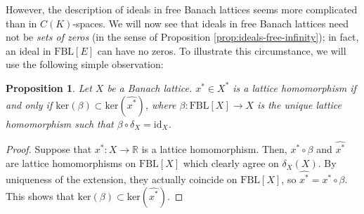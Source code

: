 \documentclass[11pt]{amsart}
\newtheorem{prop}[thm]{Proposition}
\theoremstyle{definition}
\numberwithin{equation}{section}
\newcommand{\fbl}{\text{FBL}}
\begin{document}
However, the description of ideals in free Banach lattices seems more complicated than in $C(K)$-spaces. We will now see that ideals in free Banach lattices need not be \textit{sets of zeros} (in the sense of Proposition \ref{prop:ideals-free-infinity}); in fact, an ideal in $\fbl[E]$ can have no zeros. To illustrate this circumstance, we will use the following simple observation:

\begin{prop}\label{prop:kernel-zero}
    Let $X$ be a Banach lattice. $x^*\in X^*$ is a lattice homomorphism if and only if $\text{ker}(\beta)\subset \text{ker}(\widehat{x^*})$, where $\beta:\fbl[X]\to X$ is the unique lattice homomorphism such that $\beta\circ\delta_X=\text{id}_X$.
\end{prop}
\begin{proof}
Suppose that $x^*:X\to\mathbb{R}$ is a lattice homomorphism. Then, $x^*\circ\beta$ and $\widehat{x^*}$ are lattice homomorphisms on $\fbl[X]$ which clearly agree on $\delta_X(X)$. By uniqueness of the extension, they actually coincide on $\fbl[X]$, so $\widehat{x^*}=x^*\circ\beta$. This shows that $\text{ker}(\beta)\subset\text{ker}(\widehat{x^*})$.


\end{proof}
\end{document}
